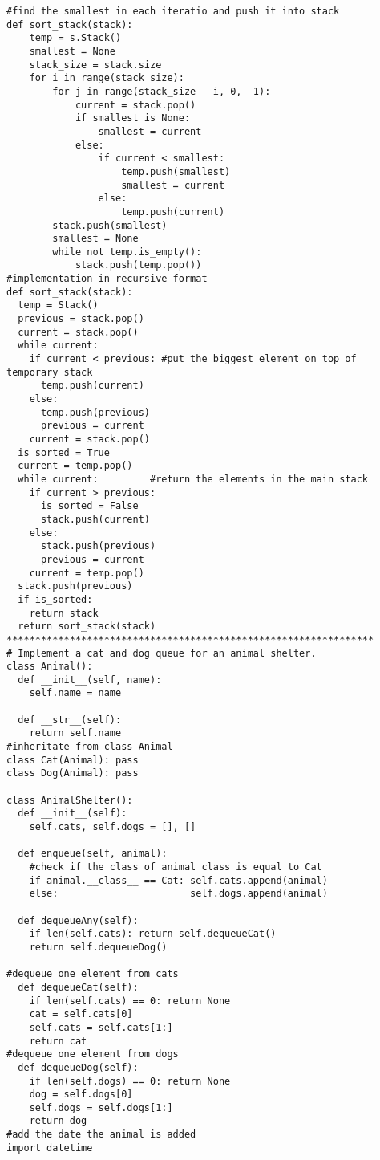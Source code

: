 \documentclass[12pt]{article}
\begin{document}
\begin{lstlisting}
#find the smallest in each iteratio and push it into stack
def sort_stack(stack):
    temp = s.Stack()
    smallest = None
    stack_size = stack.size
    for i in range(stack_size): 
        for j in range(stack_size - i, 0, -1):
            current = stack.pop()
            if smallest is None:
                smallest = current
            else:
                if current < smallest:
                    temp.push(smallest)
                    smallest = current
                else:
                    temp.push(current)
        stack.push(smallest)
        smallest = None
        while not temp.is_empty():
            stack.push(temp.pop())
#implementation in recursive format
def sort_stack(stack):
  temp = Stack()
  previous = stack.pop()
  current = stack.pop()
  while current:
    if current < previous: #put the biggest element on top of temporary stack
      temp.push(current)   
    else:
      temp.push(previous)
      previous = current
    current = stack.pop()
  is_sorted = True
  current = temp.pop()
  while current:         #return the elements in the main stack
    if current > previous:
      is_sorted = False
      stack.push(current)
    else:
      stack.push(previous)
      previous = current
    current = temp.pop()
  stack.push(previous)
  if is_sorted:
    return stack
  return sort_stack(stack)
****************************************************************
# Implement a cat and dog queue for an animal shelter.
class Animal():
  def __init__(self, name):
    self.name = name
  
  def __str__(self):
    return self.name
#inheritate from class Animal
class Cat(Animal): pass
class Dog(Animal): pass

class AnimalShelter():
  def __init__(self):
    self.cats, self.dogs = [], []
  
  def enqueue(self, animal):
    #check if the class of animal class is equal to Cat
    if animal.__class__ == Cat: self.cats.append(animal)
    else:                       self.dogs.append(animal)
  
  def dequeueAny(self):
    if len(self.cats): return self.dequeueCat()
    return self.dequeueDog()
 
#dequeue one element from cats
  def dequeueCat(self):
    if len(self.cats) == 0: return None
    cat = self.cats[0]
    self.cats = self.cats[1:]
    return cat
#dequeue one element from dogs   
  def dequeueDog(self):
    if len(self.dogs) == 0: return None
    dog = self.dogs[0]
    self.dogs = self.dogs[1:]
    return dog
#add the date the animal is added 
import datetime


\end{lstlisting}
\end{document}
